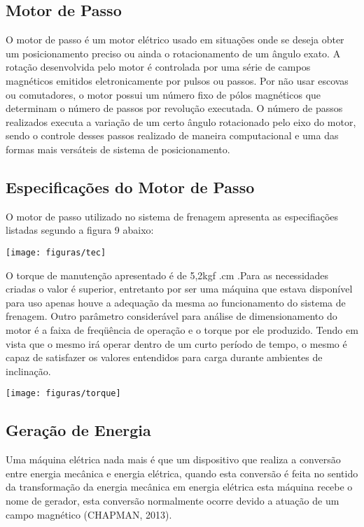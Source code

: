   \subsection{Motor de Passo }
          O motor de passo é um motor elétrico usado em situações onde se deseja obter um posicionamento preciso ou ainda o rotacionamento de um ângulo exato. A rotação desenvolvida pelo motor é controlada por uma série de campos magnéticos emitidos eletronicamente por pulsos ou passos. Por não usar escovas ou comutadores, o motor possui um número fixo de pólos magnéticos que determinam o número de passos por revolução executada.  O número de passos realizados executa a variação de um certo ângulo rotacionado pelo eixo do motor, sendo o controle desses passos realizado de maneira computacional e uma das formas mais versáteis de sistema de posicionamento.
    \subsection{Especificações do Motor de Passo }
 O motor de passo utilizado no sistema de frenagem apresenta as especifiações listadas segundo a figura 9 abaixo:


 \begin{center}
    	\texttt{[image: figuras/tec]}
        \label{tec}
    \end{center}
O torque de manutenção apresentado é de 5,2kgf .cm .Para as necessidades criadas o valor é superior, entretanto por ser uma máquina que estava disponível para uso apenas houve a adequação da mesma ao funcionamento do sistema de frenagem.
Outro parâmetro considerável para análise de dimensionamento do motor é a faixa de freqüência de operação e o torque por ele produzido. Tendo em vista que o mesmo irá operar dentro de um curto período de tempo, o mesmo é capaz de satisfazer os valores entendidos para carga durante ambientes de inclinação.


 \begin{center}
    	\texttt{[image: figuras/torque]}
        \label{toque}
    \end{center}
  \subsection{Geração de Energia }

Uma máquina elétrica nada mais é que um dispositivo que realiza a conversão entre energia mecânica e energia elétrica, quando esta conversão é feita no sentido da transformação da energia mecânica em energia elétrica esta máquina recebe o nome de gerador, esta conversão normalmente ocorre devido a atuação de um campo magnético (CHAPMAN, 2013).

